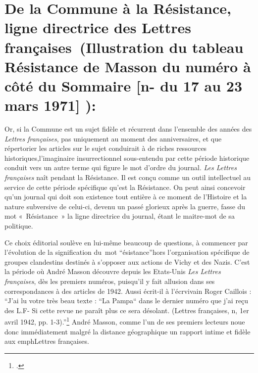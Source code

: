 


\section{De la Commune à la Résistance, ligne directrice des Lettres françaises (Illustration du tableau Résistance de Masson du numéro à côté du Sommaire [n- du 17 au 23 mars 1971] ):}

Or, si la Commune est un sujet fidèle et récurrent dans l’ensemble des années des \emph{Lettres françaises}, pas uniquement au moment des anniversaires, et que répertorier les articles sur le sujet conduirait à de riches ressources historiques,l’imaginaire insurrectionnel sous-entendu par cette période historique conduit vers un autre terme qui figure le mot d’ordre du journal. \emph{Les Lettres françaises} naît pendant la Résistance. Il est conçu comme un outil intellectuel au service de cette période spécifique qu’est la Résistance. On peut ainsi concevoir qu’un journal qui doit son existence tout entière à ce moment de l’Histoire et la nature subversive de celui-ci, devenu un passé glorieux après la guerre, fasse du mot « Résistance » la ligne directrice du journal, étant le maitre-mot de sa politique. 


	Ce choix éditorial soulève en lui-même beaucoup de questions, à commencer par l’évolution de la signification du mot \enquote{ésistance}hors l’organisation spécifique de groupes clandestins destinés à s’opposer aux actions de Vichy et des Nazis. C’est la période où André Masson découvre depuis les Etats-Unis \emph{Les Lettres françaises}, dès les premiers numéros, puisqu’il y  fait allusion dans ses correspondances à des articles de 1942. Aussi écrit-il à l’écrvivain Roger Caillois : \enquote{J’ai lu votre très beau texte : “La Pampa“ dans le dernier numéro que j’ai reçu des L.F- Si cette revue ne paraît plus ce sera désolant. (Lettres françaises, n, 1er avril 1942, pp. 1-3).}\footcite[p482]{anneessurrealistes} André Masson, comme l’un de ses premiers lecteurs noue donc immédiatement malgré la distance géographique un rapport intime et fidèle aux emph{Lettres françaises}. 


